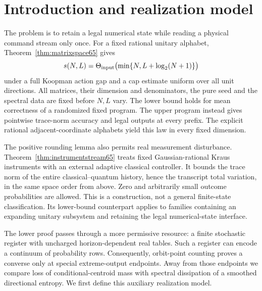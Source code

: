 \section{Introduction and realization model}

The problem is to retain a legal numerical state while reading a
physical command stream only once. For a fixed rational unitary
alphabet, Theorem~\ref{thm:matrixspace65} gives
\[
 s(N,L)=\Theta_{\rm input}\bigl(\min\{N,L+\log_2(N+1)\}\bigr)
\]
under a full Koopman action gap and a cap estimate uniform over
all unit directions. All matrices, their dimension and denominators,
the pure seed and the spectral data are fixed before $N,L$ vary.
The lower bound holds for mean correctness of a randomized fixed
program. The upper program instead gives pointwise trace-norm
accuracy and legal outputs at every prefix. The explicit rational
adjacent-coordinate alphabets yield this law in every fixed dimension.

The positive rounding lemma also permits real measurement disturbance.
Theorem~\ref{thm:instrumentstream65} treats fixed Gaussian-rational
Kraus instruments with an external adaptive classical controller.
It bounds the trace norm of the entire classical--quantum history,
hence the transcript total variation, in the same space order from
above. Zero and arbitrarily small outcome probabilities are allowed.
This is a construction, not a general finite-state classification.
Its lower-bound counterpart applies to families containing an
expanding unitary subsystem and retaining the legal numerical-state
interface.

The lower proof passes through a more permissive resource: a finite
stochastic register with uncharged horizon-dependent real tables.
Such a register can encode a continuum of probability rows.
Consequently, orbit-point counting proves a converse only at special
extreme-output endpoints. Away from those endpoints we compare loss
of conditional-centroid mass with spectral dissipation of a smoothed
directional entropy. We first define this auxiliary realization model.

